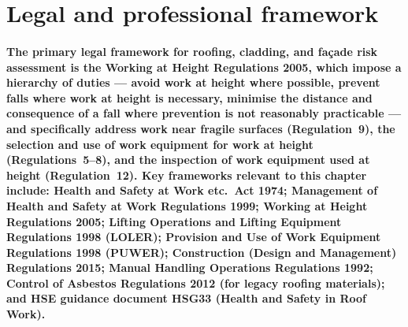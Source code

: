 \section{Legal and professional framework}

\paragraph{The primary legal framework for roofing, cladding, and façade risk assessment is the Working at Height Regulations 2005, which impose a hierarchy of duties --- avoid work at height where possible, prevent falls where work at height is necessary, minimise the distance and consequence of a fall where prevention is not reasonably practicable --- and specifically address work near fragile surfaces (Regulation~9), the selection and use of work equipment for work at height (Regulations~5--8), and the inspection of work equipment used at height (Regulation~12). Key frameworks relevant to this chapter include: Health and Safety at Work etc.\ Act 1974; Management of Health and Safety at Work Regulations 1999; Working at Height Regulations 2005; Lifting Operations and Lifting Equipment Regulations 1998 (LOLER); Provision and Use of Work Equipment Regulations 1998 (PUWER); Construction (Design and Management) Regulations 2015; Manual Handling Operations Regulations 1992; Control of Asbestos Regulations 2012 (for legacy roofing materials); and HSE guidance document HSG33 (Health and Safety in Roof Work).}

